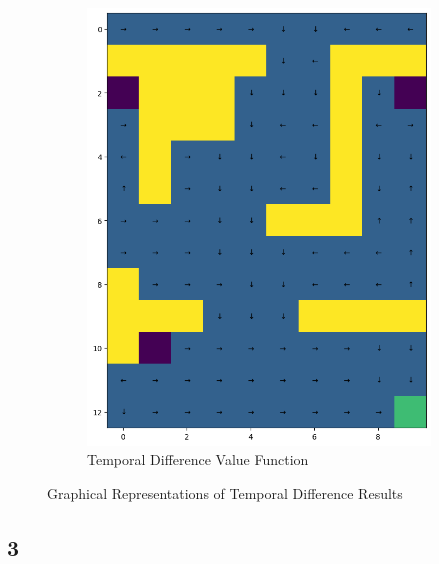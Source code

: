 \begin{figure}[H]
\begin{subfigure}[b]{0.4\textwidth}
        \centering
        \includegraphics[width=\textwidth]{assets/td/td_policy.png}        
        \caption{Temporal Difference Value Function}
    \end{subfigure}
    \caption*{Graphical Representations of Temporal Difference Results}
\end{figure} 


\subsection*{3}

